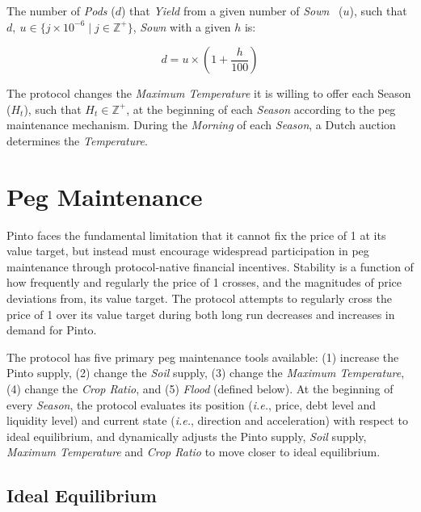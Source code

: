 \documentclass[tikz]{article}
\newcommand{\term}[1]{\textsl{#1}}
\newcommand{\Pinto}{} %
\begin{document}
The number of \term{Pods} ($d$) that \term{Yield} from a given number of \term{Sown} \Pinto\ ($u$), such that $d,\ u \in \{j \times 10^{-6} \mid j \in \mathbb{Z}^{+} \}$, \term{Sown} with a given $h$ is:

    $$
        d = u \times \left(1 + \frac{h}
                                {100}
                    \right)
    $$

The protocol changes the \term{Maximum Temperature} it is willing to offer each Season ($H_{t}$), such that $H_{t} \in \mathbb{Z}^{+}$, at the beginning of each \term{Season} according to the peg maintenance mechanism. During the \term{Morning} of each \term{Season}, a Dutch auction determines the \term{Temperature}.


\section{Peg Maintenance}

Pinto faces the fundamental limitation that it cannot fix the price of \Pinto1 at its value target, but instead must encourage widespread participation in peg maintenance through protocol-native financial incentives. Stability is a function of how frequently and regularly the price of \Pinto1 crosses, and the magnitudes of price deviations from, its value target. The protocol attempts to regularly cross the price of \Pinto1 over its value target during both long run decreases and increases in demand for Pinto.

The protocol has five primary peg maintenance tools available: (1) increase the Pinto supply, (2) change the \term{Soil} supply, (3) change the \term{Maximum Temperature}, (4) change the \term{Crop Ratio}, and (5) \term{Flood} (defined below). At the beginning of every \term{Season}, the protocol evaluates its position (\textit{i.e.}, price, debt level and liquidity level) and current state (\textit{i.e.}, direction and acceleration) with respect to ideal equilibrium, and dynamically adjusts the Pinto supply, \term{Soil} supply, \term{Maximum Temperature} and \term{Crop Ratio} to move closer to ideal equilibrium.


\subsection{Ideal Equilibrium}
\end{document}
